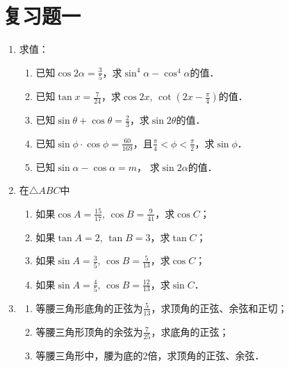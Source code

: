 \section*{复习题一}
\begin{enumerate}
    \item 求值：
\begin{enumerate}
    \item 已知$\cos2\alpha=\frac{3}{5}$，求$\sin^4\alpha-\cos^4\alpha$的值．
    \item 已知$\tan x=\frac{7}{24}$，求$\cos2x$, $\cot\left(2x-\frac{\pi}{4}\right)$的值．
    \item 已知$\sin\theta+\cos\theta=\frac{2}{3}$，求$\sin2\theta$的值．
    \item 已知$\sin\phi\cdot \cos\phi=\frac{60}{169}$，且$\frac{\pi}{4}<\phi<\frac{\pi}{2}$，求$\sin\phi$．
    \item 已知$\sin\alpha-\cos\alpha=m$， 求$\sin2\alpha$的值．
\end{enumerate}

\item 在$\triangle ABC$中
\begin{enumerate}
    \item 如果$\cos A=\frac{15}{17}$, $\cos B=\frac{9}{41}$，求$\cos C$；
    \item 如果$\tan A=2$, $\tan B=3$，求$\tan C$；
    \item 如果$\sin A=\frac{3}{5}$, $\cos B=\frac{5}{13}$，求$\cos C$；
    \item 如果$\sin A=\frac{4}{5}$, $\cos B=\frac{12}{13}$，求$\sin C$．
\end{enumerate}

\item \begin{enumerate}
    \item 等腰三角形底角的正弦为$\frac{5}{13}$，求顶角的正弦、余弦和正切；
    \item 等腰三角形顶角的余弦为$\frac{7}{25}$，求底角的正弦；
    \item 等腰三角形中，腰为底的2倍，求顶角的正弦、余弦．
\end{enumerate}


\end{enumerate}

